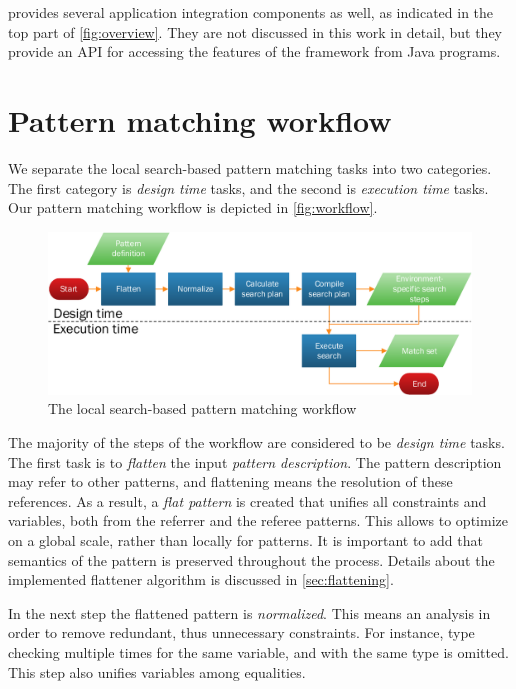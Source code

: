 \eiq provides several application integration components as well, as indicated in the top part of \autoref{fig:overview}. They are not discussed in this work in detail, but they provide an API for accessing the features of the \eiq framework from Java programs.


\section{Pattern matching workflow}
\label{sec:pattern-matching-workflow}

We separate the local search-based pattern matching tasks into two categories. The first category is \emph{design time} tasks, and the second is \emph{execution time} tasks. Our pattern matching workflow is depicted in \autoref{fig:workflow}.

\begin{figure}[!htp]
	\centering
	\includegraphics[width=\textwidth]{figures/pdfs/query_execution_workflow.pdf}
	\caption{The local search-based pattern matching workflow}
	\label{fig:workflow}
\end{figure}

The majority of the steps of the workflow are considered to be \emph{design time} tasks. The first task is to \emph{flatten} the input \emph{pattern description}. The pattern description may refer to other patterns, and flattening means the resolution of these references. As a result, a \emph{flat pattern} is created that unifies all constraints and variables, both from the referrer and the referee patterns. This allows to optimize on a global scale, rather than locally for patterns. It is important to add that semantics of the pattern is preserved throughout the process. Details about the implemented flattener algorithm is discussed in \autoref{sec:flattening}.

In the next step the flattened pattern is \emph{normalized}. This means an analysis in order to remove redundant, thus unnecessary constraints. For instance, type checking multiple times for the same variable, and with the same type is omitted. This step also unifies variables among equalities.

